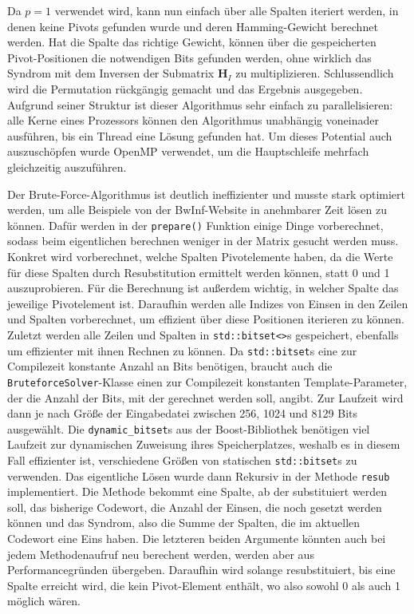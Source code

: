 \documentclass[a4paper,10pt,ngerman]{scrartcl}
\begin{document}
Da $p=1$ verwendet wird, kann nun einfach über alle Spalten iteriert werden, in denen keine Pivots gefunden wurde und deren Hamming-Gewicht berechnet werden. 
Hat die Spalte das richtige Gewicht, können über die gespeicherten Pivot-Positionen die notwendigen Bits gefunden werden, ohne wirklich das Syndrom mit dem Inversen der Submatrix $\mathbf{H}_I$ zu multiplizieren.
Schlussendlich wird die Permutation rückgängig gemacht und das Ergebnis ausgegeben. 
Aufgrund seiner Struktur ist dieser Algorithmus sehr einfach zu parallelisieren: alle Kerne eines Prozessors können den Algorithmus unabhängig voneinader ausführen, bis ein Thread eine Lösung gefunden hat.
Um dieses Potential auch auszuschöpfen wurde OpenMP verwendet, um die Hauptschleife mehrfach gleichzeitig auszuführen.

Der Brute-Force-Algorithmus ist deutlich ineffizienter und musste stark optimiert werden, um alle Beispiele von der BwInf-Website in anehmbarer Zeit lösen zu können. 
Dafür werden in der \lstinline{prepare()} Funktion einige Dinge vorberechnet, sodass beim eigentlichen berechnen weniger in der Matrix gesucht werden muss. 
Konkret wird vorberechnet, welche Spalten Pivotelemente haben, da die Werte für diese Spalten durch Resubstitution ermittelt werden können, statt 0 und 1 auszuprobieren. 
Für die Berechnung ist außerdem wichtig, in welcher Spalte das jeweilige Pivotelement ist. 
Daraufhin werden alle Indizes von Einsen in den Zeilen und Spalten vorberechnet, um effizient über diese Positionen iterieren zu können. 
Zuletzt werden alle Zeilen und Spalten in \lstinline{std::bitset<>}s gespeichert, ebenfalls um effizienter mit ihnen Rechnen zu können.
Da \lstinline{std::bitset}s eine zur Compilezeit konstante Anzahl an Bits benötigen, braucht auch die \lstinline{BruteforceSolver}-Klasse einen zur Compilezeit konstanten Template-Parameter, der die Anzahl der Bits, mit der gerechnet werden soll, angibt.  
Zur Laufzeit wird dann je nach Größe der Eingabedatei zwischen 256, 1024 und 8129 Bits ausgewählt. 
Die \lstinline{dynamic_bitset}s aus der Boost-Bibliothek benötigen viel Laufzeit zur dynamischen Zuweisung ihres Speicherplatzes, weshalb es in diesem Fall effizienter ist, verschiedene Größen von statischen \lstinline{std::bitset}s zu verwenden.
Das eigentliche Lösen wurde dann Rekursiv in der Methode \lstinline{resub} implementiert.
Die Methode bekommt eine Spalte, ab der substituiert werden soll, das bisherige Codewort, die Anzahl der Einsen, die noch gesetzt werden können und das Syndrom, also die Summe der Spalten, die im aktuellen Codewort eine Eins haben. 
Die letzteren beiden Argumente könnten auch bei jedem Methodenaufruf neu berechent werden, werden aber aus Performancegründen übergeben. 
Daraufhin wird solange resubstituiert, bis eine Spalte erreicht wird, die kein Pivot-Element enthält, wo also sowohl 0 als auch 1 möglich wären.
\end{document}
